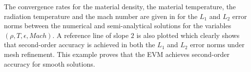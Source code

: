 \documentclass[times,doublespace]{fldauth}%
\begin{document}
%
The convergence rates for the material density, the material temperature, the radiation temperature and the mach number are given in  for the $L_1$ and $L_2$ error norms between the numerical and semi-analytical solutions for the variables $(\rho, T, \epsilon, Mach)$. A reference line of slope $2$ is also plotted which clearly shows that second-order accuracy is achieved in both the $L_1$ and $L_2$ error norms under mesh refinement. This example proves that the EVM achieves second-order accuracy for smooth solutions.
%
\end{document}
